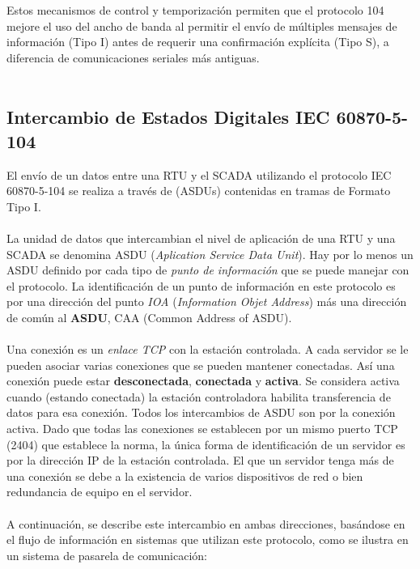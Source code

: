 \documentclass[a5paper]{book}%
\begin{document}
Estos mecanismos de control y temporización permiten que el protocolo 104 mejore el uso del ancho de banda al permitir el envío de múltiples mensajes de información (Tipo I) antes de requerir una confirmación explícita (Tipo S), a diferencia de comunicaciones seriales más antiguas.\\\\

\subsection{Intercambio de Estados Digitales IEC 60870-5-104}

El envío de un datos entre una RTU y el SCADA utilizando el protocolo IEC 60870-5-104 se realiza a través de (ASDUs) contenidas en tramas de Formato Tipo I.\\\\

La unidad de datos que intercambian el nivel de aplicación de una RTU y una SCADA se denomina ASDU (\textit{Aplication Service Data Unit}). Hay por lo menos un ASDU definido por cada tipo de \textit{punto de información} que se puede manejar con el protocolo. La identificación de un punto de información en este protocolo es por una dirección del punto \textit{IOA} (\textit{Information Objet Address}) más una dirección de común al \textbf{ASDU}, CAA (Common Address of ASDU).\\\\


Una conexión es un \textit{enlace TCP} con la estación controlada. A cada servidor se le pueden asociar varias conexiones que se pueden mantener conectadas. Así una conexión puede estar 
	\textbf{desconectada}, \textbf{conectada} y \textbf{activa}. Se considera activa cuando (estando conectada) la estación controladora habilita transferencia de datos para esa conexión. Todos los intercambios de ASDU son por la conexión activa. Dado que todas las conexiones se establecen por un mismo puerto TCP (2404) que establece la norma, la única forma de identificación de un servidor es por la dirección IP de la estación controlada. El que un servidor tenga más de una conexión se debe a la existencia de varios dispositivos de red o bien redundancia de equipo en el servidor.\\\\

A continuación, se describe este intercambio en ambas direcciones, basándose en el flujo de información en sistemas que utilizan este protocolo, como se ilustra en un sistema de pasarela de comunicación:
\end{document}
